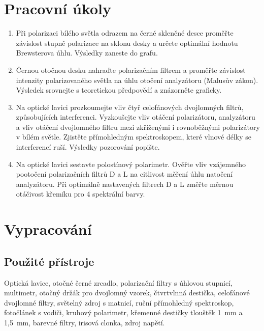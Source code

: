 \documentclass[english]{article}
\begin{document}


\setlength{\parindent}{0.5cm}
\section{Pracovní úkoly}
	  \begin{enumerate}
	\item Při polarizaci bílého světla odrazem na černé skleněné desce proměřte závislost stupně polarizace na sklonu desky a určete optimální hodnotu Brewsterova úhlu. Výsledky zaneste do grafu.
	
	\item Černou otočnou desku nahraďte polarizačním filtrem a proměřte závislost intenzity polarizovaného světla na úhlu otočení analyzátoru (Malusův zákon). Výsledek srovnejte s teoretickou předpovědí a znázorněte graficky.
	
	\item Na optické lavici prozkoumejte vliv čtyř celofánových dvojlomných filtrů, způsobujících interferenci. Vyzkoušejte vliv otáčení polarizátoru, analyzátoru a vliv otáčení dvojlomného filtru mezi zkříženými i rovnoběžnými polarizátory v bílém světle. Zjistěte přímohledným spektroskopem, které vlnové délky se interferencí ruší. Výsledky pozorování popište.
	
	\item Na optické lavici sestavte polostínový polarimetr. Ověřte vliv vzájemného pootočení polarizačních filtrů D a L na citlivost měření úhlu natočení analyzátoru. Při optimálně nastavených filtrech D a L změřte měrnou otáčivost křemíku pro 4 spektrální barvy.
	
	  \end{enumerate}

\section{Vypracování}

	\subsection{Použité přístroje}
		Optická lavice, otočné černé zrcadlo, polarizační filtry s úhlovou stupnicí, multimetr, otočný držák pro dvojlomný vzorek, čtvrtvlnná destička, celofánové dvojlomné filtry, světelný zdroj s matnicí, ruční přímohledný spektroskop, fotočlánek s vodiči, kruhový polarimetr, křemenné destičky tlouštěk 1~mm a 1,5~mm, barevné filtry, irisová clonka, zdroj napětí. 
					
\end{document}
